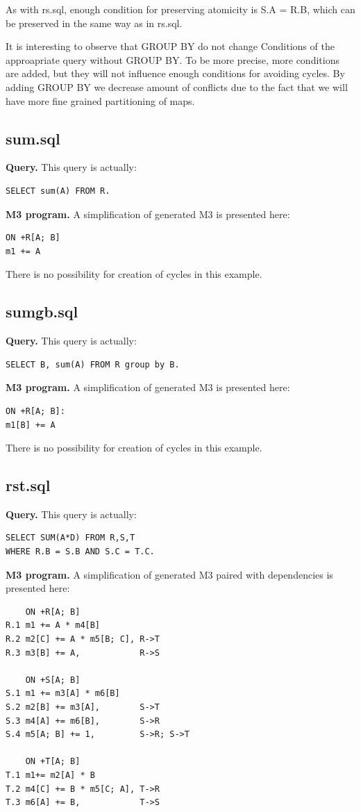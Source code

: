 \documentclass{sig-semester}
\begin{document}
As with rs.sql, enough condition for preserving atomicity is S.A = R.B, which can be preserved in the same way as in rs.sql.

It is interesting to observe that GROUP BY do not change Conditions of the approapriate query without GROUP BY. To be more precise, more conditions are added, but they will not influence enough conditions for avoiding cycles. By adding GROUP BY we decrease amount of conflicts due to the fact that we will have more fine grained partitioning of maps.

\subsection{sum.sql}
\textbf{Query.} This query is actually:
\begin{verbatim}
SELECT sum(A) FROM R.
\end{verbatim}

\textbf{M3 program.} A simplification of generated M3 is presented here:
\begin{verbatim}
ON +R[A; B]
m1 += A
\end{verbatim}

There is no possibility for creation of cycles in this example.

\subsection{sumgb.sql}
\textbf{Query.} This query is actually:
\begin{verbatim}
SELECT B, sum(A) FROM R group by B.
\end{verbatim}

\textbf{M3 program.} A simplification of generated M3 is presented here:
\begin{verbatim}
ON +R[A; B]:
m1[B] += A
\end{verbatim}

There is no possibility for creation of cycles in this example.

\subsection{rst.sql}
\textbf{Query.} This query is actually:
\begin{verbatim}
SELECT SUM(A*D) FROM R,S,T 
WHERE R.B = S.B AND S.C = T.C.
\end{verbatim}

\textbf{M3 program.} A simplification of generated M3 paired with dependencies is presented here:
\begin{verbatim}
    ON +R[A; B]
R.1 m1 += A * m4[B]
R.2 m2[C] += A * m5[B; C], R->T
R.3 m3[B] += A,            R->S

    ON +S[A; B] 
S.1 m1 += m3[A] * m6[B]
S.2 m2[B] += m3[A],        S->T
S.3 m4[A] += m6[B],        S->R
S.4 m5[A; B] += 1,         S->R; S->T

    ON +T[A; B]
T.1 m1+= m2[A] * B
T.2 m4[C] += B * m5[C; A], T->R
T.3 m6[A] += B,            T->S
\end{verbatim}
\end{document}
